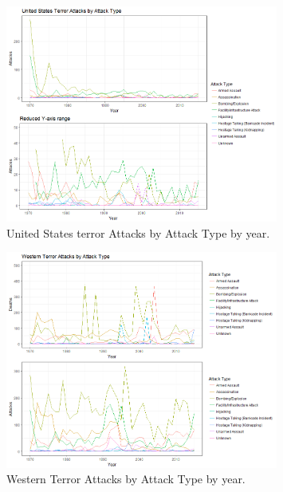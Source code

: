 \documentclass[10pt,a4paper]{article}
\begin{document}
\begin{center}
\begin{figure}[H]
	\includegraphics[width=0.8\textwidth]{Plots/AttackType/Attacks.png}
	\caption{United States terror Attacks by Attack Type by year.}
\end{figure}

\begin{figure}[H]
	\includegraphics[width=0.8\textwidth]{Plots/AttackType/AttackTypeWesternCountries.png}
	\caption{Western Terror Attacks by Attack Type by year.}
\end{figure}


\end{center}
\end{document}
